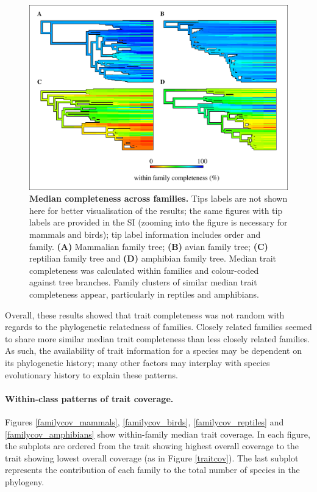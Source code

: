 \begin{figure}[h!]
\centering
\includegraphics[scale=0.75]{figures/chapter2/NA_phylo_patterns/Completeness_all}
\caption[Median completeness across families]{\textbf{Median completeness across families.} Tips labels are not shown here for better visualisation of the results; the same figures with tip labels are provided in the SI (zooming into the figure is necessary for mammals and birds); tip label information includes order and family. \textbf{(A)} Mammalian family tree; \textbf{(B)} avian family tree; \textbf{(C)} reptilian family tree and \textbf{(D)} amphibian family tree. Median trait completeness was calculated within families and colour-coded  against tree branches. Family clusters of similar median trait completeness appear, particularly in reptiles and amphibians.}
\label{classcomp}
\end{figure}

Overall, these results showed that trait completeness was not random with regards to the phylogenetic relatedness of families. Closely related families seemed to share more similar median trait completeness than less closely related families. As such, the availability of trait information for a species may be dependent on its phylogenetic history; many other factors may interplay with species evolutionary history to explain these patterns. 

\pagebreak
\paragraph{Within-class patterns of trait coverage.} Figures \ref{familycov_mammals}, \ref{familycov_birds}, \ref{familycov_reptiles} and \ref{familycov_amphibians} show within-family median trait coverage. In each figure, the subplots are ordered from the trait showing highest overall coverage to the trait showing lowest overall coverage (as in Figure \ref{traitcov}). The last subplot represents the contribution of each family to the total number of species in the phylogeny. 

